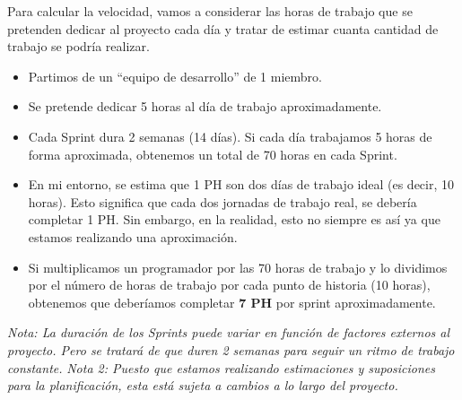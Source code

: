 Para calcular la velocidad, vamos a considerar las horas de trabajo que se pretenden dedicar al proyecto cada día y tratar
de estimar cuanta cantidad de trabajo se podría realizar.

\begin{itemize}
    \item Partimos de un ``equipo de desarrollo'' de 1 miembro.
    \item Se pretende dedicar 5 horas al día de trabajo aproximadamente.
    \item Cada Sprint dura 2 semanas (14 días). Si cada día trabajamos 5 horas de forma aproximada, obtenemos un total de 70 horas
          en cada Sprint.
    \item En mi entorno, se estima que 1 PH son dos días de trabajo ideal (es decir, 10 horas).
          Esto significa que cada dos jornadas de trabajo real, se debería completar 1 PH. Sin embargo, en la realidad, esto no siempre
          es así ya que estamos realizando una aproximación.
    \item Si multiplicamos un programador por las 70 horas de trabajo y lo dividimos por el número de horas de trabajo por cada punto de historia
          (10 horas), obtenemos que deberíamos completar \textbf{7 PH} por sprint aproximadamente.
\end{itemize}

\textit{Nota: La duración de los Sprints puede variar en función de factores externos al proyecto. Pero se tratará de que duren
    2 semanas para seguir un ritmo de trabajo constante.}
\textit{Nota 2: Puesto que estamos realizando estimaciones y suposiciones para la planificación, esta está sujeta a cambios a
    lo largo del proyecto.}

